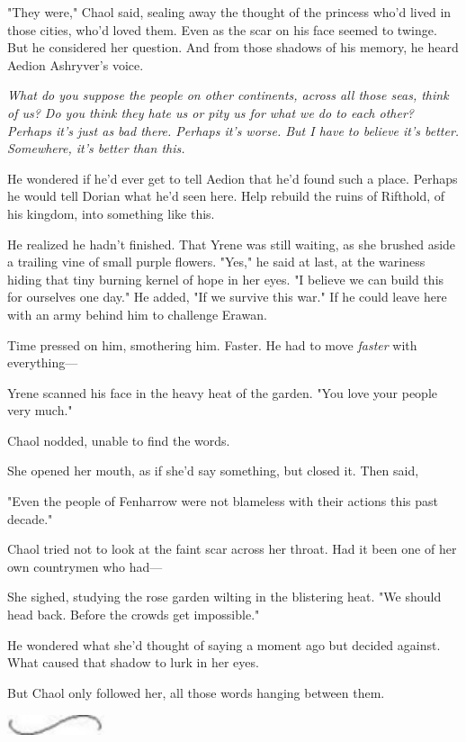 "They were," Chaol said, sealing away the thought of the princess who'd lived in those cities, who'd loved them. Even as the scar on his face seemed to twinge. But he considered her question. And from those shadows of his memory, he heard Aedion Ashryver's voice.

\emph{What do you suppose the people on other continents, across all those seas, think of us? Do you think they hate us or pity us for what we do to each other? Perhaps it's just as bad there. Perhaps it's worse. But  I have to believe it's better. Somewhere, it's better than this.}

He wondered if he'd ever get to tell Aedion that he'd found such a place. Perhaps he would tell Dorian what he'd seen here. Help rebuild the ruins of Rifthold, of his kingdom, into something like this.

He realized he hadn't finished. That Yrene was still waiting, as she brushed aside a trailing vine of small purple flowers. "Yes," he said at last, at the wariness hiding that tiny burning kernel of hope in her eyes. "I believe we can build this for ourselves one day." He added, "If we survive this war." If he could leave here with an army behind him to challenge Erawan.

Time pressed on him, smothering him. Faster. He had to move
\emph{faster} with everything---

Yrene scanned his face in the heavy heat of the garden. "You love your people very much."

Chaol nodded, unable to find the words.

She opened her mouth, as if she'd say something, but closed it. Then said,

"Even the people of Fenharrow were not blameless with their actions this past decade."

Chaol tried not to look at the faint scar across her throat. Had it been one of her own countrymen who had---

She sighed, studying the rose garden wilting in the blistering heat. "We should head back. Before the crowds get impossible."

He wondered what she'd thought of saying a moment ago but decided against. What caused that shadow to lurk in her eyes.

But Chaol only followed her, all those words hanging between them.

\includegraphics[width=1.12in,height=0.24in]{images/seperator}

